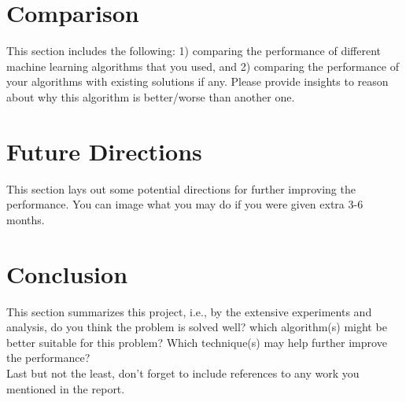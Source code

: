 \documentclass[conference]{IEEEtran}
\begin{document}
\section{Comparison}  
This section includes the following: 1) comparing the performance of different machine learning algorithms that you used, and 2) comparing the performance of your algorithms with existing solutions if any. Please provide insights to reason about why this algorithm is better/worse than another one.

\section{Future Directions}
This section lays out some potential directions for further improving the performance. You can image what you may do if you were given extra 3-6 months.

\section{Conclusion}
This section summarizes this project, i.e., by the extensive experiments and analysis, do you think the problem is solved well? which algorithm(s) might be better suitable for this problem? Which technique(s) may help further improve the performance? \\

Last but not the least, don't forget to include references to any work you mentioned in the report.
  



\end{document}
